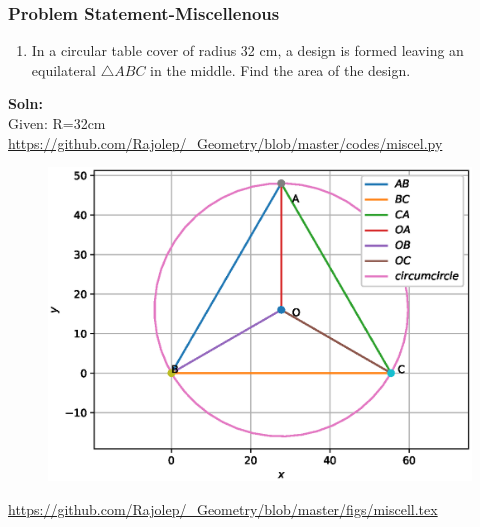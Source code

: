 \begin{frame}
\frametitle{Problem Statement-Miscellenous}
\begin{enumerate}[label=(\roman*)]
\item In a circular table cover of radius 32 cm, a design is formed leaving an equilateral $\triangle{ABC}$
in the middle. Find the area of the design.\\
\end{enumerate}
\textbf{Soln:}\\
  Given: R=32cm\\
\url{https://github.com/Rajolep/_Geometry/blob/master/codes/miscel.py}
\begin{figure}
\includegraphics[scale=0.3]{./figs/misc.eps}
\end{figure}
\end{frame}
\begin{frame}
\url{https://github.com/Rajolep/_Geometry/blob/master/figs/miscell.tex}
\begin{figure}

\end{figure}
\end{frame}